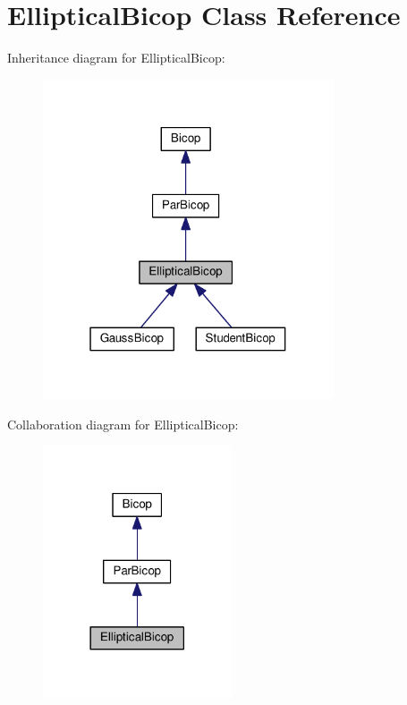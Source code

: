 \hypertarget{class_elliptical_bicop}{}\section{Elliptical\+Bicop Class Reference}
\label{class_elliptical_bicop}


Inheritance diagram for Elliptical\+Bicop\+:\nopagebreak
\begin{figure}[H]
\begin{center}
\leavevmode
\includegraphics[width=244pt]{class_elliptical_bicop__inherit__graph}
\end{center}
\end{figure}


Collaboration diagram for Elliptical\+Bicop\+:\nopagebreak
\begin{figure}[H]
\begin{center}
\leavevmode
\includegraphics[width=158pt]{class_elliptical_bicop__coll__graph}
\end{center}
\end{figure}
